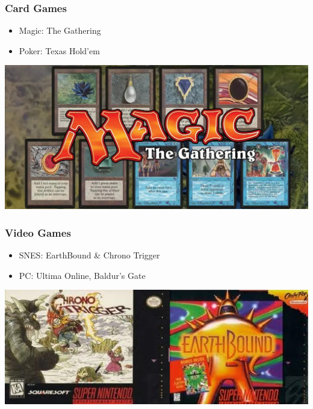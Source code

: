 \documentclass{beamer}
\begin{document}
\begin{frame}
	\frametitle{Card Games}
	\begin{itemize}
		\item Magic: The Gathering
		\item Poker: Texas Hold'em
	\end{itemize}
	\begin{center}
		\includegraphics[width = 1.0\textwidth]{images/mtg.jpg}
	\end{center}
\end{frame}

\begin{frame}
	\frametitle{Video Games}
	\begin{itemize}
		\item SNES:  EarthBound \& Chrono Trigger
		\item PC:    Ultima Online, Baldur's Gate
	\end{itemize}
	\begin{center}
		\includegraphics[width = 1.0\textwidth]{images/snes.jpg}
	\end{center}
\end{frame}
		
\end{document}
